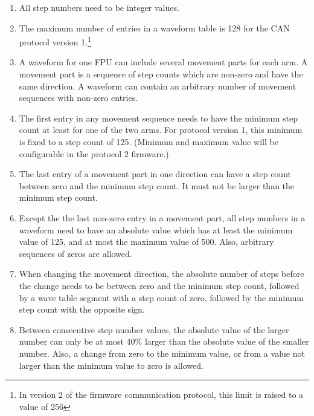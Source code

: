 \documentclass[11pt,a4paper]{scrartcl}
\begin{document}
\begin{enumerate}

\item All step numbers need to be integer values.

\item The maximum number of entries in a waveform table is 128 for the
  CAN protocol version 1.\footnote{In version 2 of the firmware
    communication protocol, this limit is raised to a value of 256}
  
\item A waveform for one FPU can include several movement parts for
  each arm. A movement part is a sequence of step counts which are
  non-zero and have the same direction.  A waveform can contain an
  arbitrary number of movement sequences with non-zero entries.

\item The first entry in any movement sequence needs to have the
  minimum step count at least for one of the two arms.  For protocol
  version 1, this minimum is fixed to a step count of 125. (Minimum
  and maximum value will be configurable in the protocol 2 firmware.)

\item The last entry of a movement part in one direction can have a
  step count between zero and the minimum step count. It must not be
  larger than the minimum step count.
  
\item Except the the last non-zero entry in a movement part, all step
  numbers in a waveform need to have an absolute value which has at
  least the minimum value of 125, and at most the maximum value of
  500. Also, arbitrary sequences of zeros are allowed.

\item When changing the movement direction, the absolute number of
  steps before the change needs to be between zero and the minimum
  step count, followed by a wave table segment with a step count of
  zero, followed by the minimum step count with the opposite sign.

\item Between consecutive step number values, the absolute value of
  the larger number can only be at most 40\% larger than the absolute
  value of the smaller number. Also, a change from zero to the minimum
  value, or from a value not larger than the minimum value to zero is
  allowed.

  
\end{enumerate}
\end{document}
